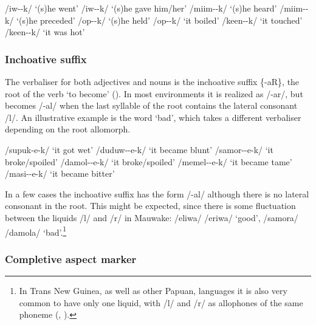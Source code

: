 \ea
\ea
/iw--k/  `(s)he went'
\ex
/iw--k/  `(s)he gave him/her'
\ex
/miim--k/  `(s)he heard'
\ex
/miim--k/  `(s)he preceded'
\ex
/op--k/  `(s)he held'
\ex
/op--k/  `it boiled'
\ex
/keen--k/  `it touched'
\ex
/keen--k/  `it was hot'
\z
\z

\subsubsection{Inchoative suffix} \label{sec:2.3.3.4}

The verbaliser for both adjectives and nouns is the inchoative suffix \{-aR\}, the root of the verb `to become' ().  In most environments it is realized as /\nobreakdash-ar/, but becomes /-al/ when the last syllable of the root contains the lateral consonant /l/.  An illustrative example is the word  `bad', which takes a different verbaliser depending on the root allomorph.

\ea
\ea
/supuk-e-k/  `it got wet'
\ex
/duduw--e-k/  `it became blunt'
\ex
/samor--e-k/  `it broke/spoiled'
\ex
/damol--e-k/  `it broke/spoiled'
\ex
/memel--e-k/  `it became tame'
\ex
/masi--e-k/  `it became bitter'
\z
\z

In a few cases the inchoative suffix has the form /-al/ although there is no lateral consonant in the root.  This might be expected, since there is some fluctuation between the liquids /l/ and /r/ in Mauwake: /eliwa/ {\Tilde} /eriwa/ `good', /samora/ {\Tilde} /damola/ `bad'.\footnote{In Trans New Guinea, as well as other Papuan, languages it is also very common to have only one liquid, with /l/ and /r/ as allophones of the same phoneme (\citealt[55]{Wurm1982}, \citealt[55]{Foley1986}).} 


\subsubsection{Completive aspect marker}\label{sec:2:z:y:x}

